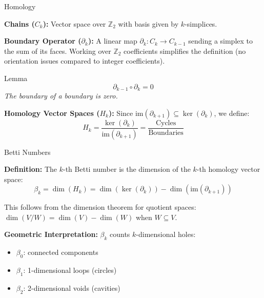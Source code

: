 \documentclass{beamer}
\begin{document}
\begin{frame}{Homology}

\textbf{Chains ($C_k$):} Vector space over $\mathbb{Z}_2$ with basis given by $k$-simplices.

\textbf{Boundary Operator ($\partial_k$):} A linear map $\partial_k: C_k \to C_{k-1}$ sending a simplex to the sum of its faces. Working over $\mathbb{Z}_2$ coefficients simplifies the definition (no orientation issues compared to integer coefficients).

\begin{alertblock}{Lemma}
    $$\partial_{k-1} \circ \partial_k = 0$$
    \emph{The boundary of a boundary is zero.}
\end{alertblock}

\textbf{Homology Vector Spaces ($H_k$):}
    Since $\text{im}(\partial_{k+1}) \subseteq \ker(\partial_k)$, we define:
    $$ H_k = \frac{\ker(\partial_k)}{\text{im}(\partial_{k+1})} = \frac{\text{Cycles}}{\text{Boundaries}} $$

\end{frame}

\begin{frame}{Betti Numbers}

\textbf{Definition:} The $k$-th Betti number is the dimension of the $k$-th homology vector space:
$$\beta_k = \dim(H_k) = \dim(\ker(\partial_k)) - \dim(\text{im}(\partial_{k+1}))$$

This follows from the dimension theorem for quotient spaces: $\dim(V/W) = \dim(V) - \dim(W)$ when $W \subseteq V$.

\textbf{Geometric Interpretation:} $\beta_k$ counts $k$-dimensional holes:
\begin{itemize}
    \item $\beta_0$: connected components
    \item $\beta_1$: 1-dimensional loops (circles)
    \item $\beta_2$: 2-dimensional voids (cavities)
\end{itemize}

\end{frame}
\end{document}
